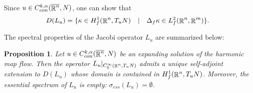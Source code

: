 \documentclass[a4paper,11pt,reqno]{amsart}
\newtheorem{prop}[defn]{Proposition}
\def\R{\mathop{\rm \mathbb{R}}\nolimits}
\begin{document}
Since $u\in C_{con}^{k,\alpha}(\overline{\R^n},N)$, one can show that
\begin{eqnarray*}
D(L_u)=\{\kappa\in H^1_f(\R^n,T_uN)\quad|\quad \Delta_f\kappa\in L^2_f(\R^n,\R^m)\}.
\end{eqnarray*}

The spectral properties of the Jacobi operator $L_u$ are summarized below:

\begin{prop}\label{emp-spec-egs}
Let $u \in C_{con}^{k,\alpha}(\overline{\R^n},N)$ be an expanding solution of the harmonic map flow. 
Then the operator $L_u|_{C_0^{\infty}(\R^n,T_uN)}$ admits a unique self-adjoint extension to $D(L_u)$ whose domain is contained in $H^{1}_f(\R^n,T_uN)$. Moreover, the essential spectrum of $L_u$ is empty:
$\sigma_{ess}(L_u)=\emptyset$.
\end{prop}
\end{document}
